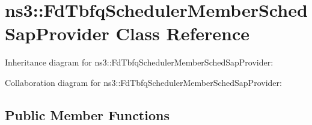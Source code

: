 \hypertarget{classns3_1_1FdTbfqSchedulerMemberSchedSapProvider}{}\section{ns3\+:\+:Fd\+Tbfq\+Scheduler\+Member\+Sched\+Sap\+Provider Class Reference}
\label{classns3_1_1FdTbfqSchedulerMemberSchedSapProvider}


Inheritance diagram for ns3\+:\+:Fd\+Tbfq\+Scheduler\+Member\+Sched\+Sap\+Provider\+:


Collaboration diagram for ns3\+:\+:Fd\+Tbfq\+Scheduler\+Member\+Sched\+Sap\+Provider\+:
\subsection*{Public Member Functions}
